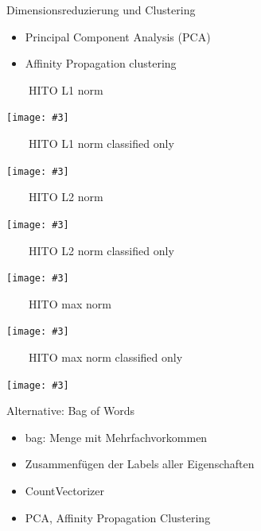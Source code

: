 \documentclass[aspectratio=1610]{beamer}%
\newcommand{\imageslide}[4][]
{
\begin{frame}[plain]{~~~~#2}
\vspace{0.2em}
\begin{center}
\centering\texttt{[image: \#3]}
\end{center}
#1
\note{#4}
\end{frame}
}
\begin{document}

\begin{frame}{Dimensionsreduzierung und Clustering}
\begin{itemize}
\item Principal Component Analysis (PCA)
\item Affinity Propagation clustering
\end{itemize}
\end{frame}

\imageslide{HITO L1 norm}{img/cluster-l1.pdf}{}
\imageslide{HITO L1 norm classified only}{img/cluster-classifiedonly-l1.pdf}{}
\imageslide{HITO L2 norm}{img/cluster-l2.pdf}{}
\imageslide{HITO L2 norm classified only}{img/cluster-classifiedonly-l2.pdf}{}
\imageslide{HITO max norm}{img/cluster-max.pdf}{}
\imageslide{HITO max norm classified only}{img/cluster-classifiedonly-max.pdf}{}


\begin{frame}{Alternative: Bag of Words}
\begin{itemize}
\item bag: Menge mit Mehrfachvorkommen
\item Zusammenfügen der Labels aller Eigenschaften
\item CountVectorizer
\item PCA, Affinity Propagation Clustering
\end{itemize}
\end{frame}
\end{document}
